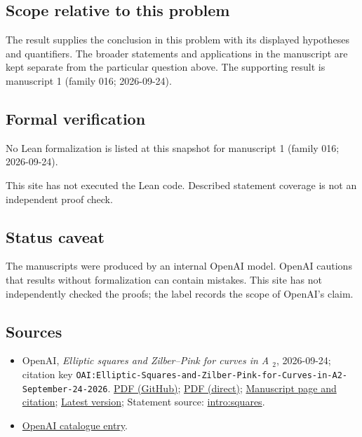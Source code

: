 \documentclass[11pt]{article}
\begin{document}
\subsection{Scope relative to this problem}
The result supplies the conclusion in this problem with its displayed hypotheses and quantifiers. The broader statements and applications in the manuscript are kept separate from the particular question above. The supporting result is manuscript 1 (family 016; 2026-09-24).

\subsection{Formal verification}
No Lean formalization is listed at this snapshot for manuscript 1 (family 016; 2026-09-24).

This site has not executed the Lean code. Described statement coverage is not an independent proof check.

\subsection{Status caveat}
The manuscripts were produced by an internal OpenAI model. OpenAI cautions that results without formalization can contain mistakes. This site has not independently checked the proofs; the label records the scope of OpenAI's claim.

\subsection{Sources}
\begin{itemize}
\item OpenAI, \emph{Elliptic squares and Zilber–Pink for curves in A \({}_{2}\)}, 2026-09-24; citation key \texttt{OAI:Elliptic-Squares-and-Zilber-Pink-for-Curves-in-A2-September-24-2026}. \href{https://github.com/openai/math/blob/adc7f1241b42e322a6451854ab7e4b4c146bf78a/preprints/Elliptic-Squares-and-Zilber-Pink-for-Curves-in-A2-September-24-2026/paper.pdf}{PDF (GitHub)}; \href{https://github.com/openai/math/raw/adc7f1241b42e322a6451854ab7e4b4c146bf78a/preprints/Elliptic-Squares-and-Zilber-Pink-for-Curves-in-A2-September-24-2026/paper.pdf}{PDF (direct)}; \href{https://github.com/openai/math/blob/adc7f1241b42e322a6451854ab7e4b4c146bf78a/preprints/Elliptic-Squares-and-Zilber-Pink-for-Curves-in-A2-September-24-2026/README.md}{Manuscript page and citation}; \href{https://github.com/openai/math/blob/main/preprints/Elliptic-Squares-and-Zilber-Pink-for-Curves-in-A2-September-24-2026/paper.pdf}{Latest version}; Statement source: \href{https://github.com/openai/math/blob/adc7f1241b42e322a6451854ab7e4b4c146bf78a/preprints/Elliptic-Squares-and-Zilber-Pink-for-Curves-in-A2-September-24-2026/build/sections/01-introduction.tex\#L24}{intro:squares}.
\item \href{https://github.com/openai/math/blob/adc7f1241b42e322a6451854ab7e4b4c146bf78a/CONTENTS.md}{OpenAI catalogue entry}.
\end{itemize}
\end{document}
